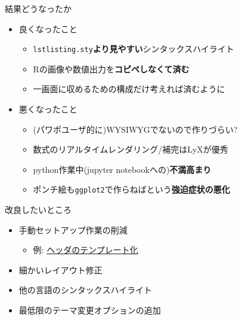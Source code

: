 \documentclass[14pt,ignorenonframetext,]{beamer}
\providecommand{\tightlist}{%
  \setlength{\itemsep}{0pt}\setlength{\parskip}{0pt}}
\begin{document}
\begin{frame}[fragile]{結果どうなったか}
\protect\hypertarget{ux7d50ux679cux3069ux3046ux306aux3063ux305fux304b}{}

\begin{itemize}
\tightlist
\item
  良くなったこと

  \begin{itemize}
  \tightlist
  \item
    \texttt{lstlisting.sty}\textbf{より見やすい}シンタックスハイライト
  \item
    Rの画像や数値出力を\textbf{コピペしなくて済む}
  \item
    一画面に収めるための構成だけ考えれば済むように
  \end{itemize}
\item
  悪くなったこと

  \begin{itemize}
  \tightlist
  \item
    (パワポユーザ的に)WYSIWYGでないので作りづらい?
  \item
    数式のリアルタイムレンダリング/補完はLyXが優秀
  \item
    python作業中(jupyter notebookへの)\textbf{不満高まり}
  \item
    ポンチ絵も\texttt{ggplot2}で作らねばという\textbf{強迫症状の悪化}
  \end{itemize}
\end{itemize}

\end{frame}

\begin{frame}{改良したいところ}
\protect\hypertarget{ux6539ux826fux3057ux305fux3044ux3068ux3053ux308d}{}

\begin{itemize}
\tightlist
\item
  手動セットアップ作業の削減

  \begin{itemize}
  \tightlist
  \item
    例:
    \href{https://atusy.github.io/tokyor85-original-rmd-format}{ヘッダのテンプレート化}
  \end{itemize}
\item
  細かいレイアウト修正
\item
  他の言語のシンタックスハイライト
\item
  最低限のテーマ変更オプションの追加
\end{itemize}

\end{frame}
\end{document}
